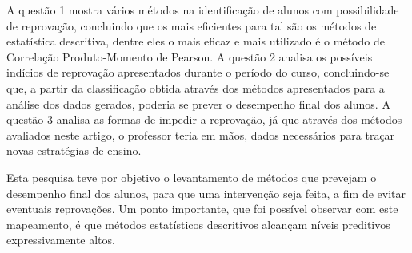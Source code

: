 \documentclass[12pt]{article}
\begin{document}
A questão 1 mostra vários métodos na identificação de alunos com possibilidade de reprovação, concluindo que os mais eficientes para tal são os métodos de estatística descritiva, dentre eles o mais eficaz e mais utilizado é o método de Correlação Produto-Momento de Pearson. A questão 2 analisa os possíveis indícios de reprovação apresentados durante o período do curso, concluindo-se que, a partir da classificação obtida através dos métodos apresentados para a análise dos dados gerados, poderia se prever o desempenho final dos alunos. A questão 3 analisa as formas de impedir a reprovação, já que através dos métodos avaliados neste artigo, o professor teria em mãos, dados necessários para traçar novas estratégias de ensino.

Esta pesquisa teve por objetivo o levantamento de métodos que prevejam o desempenho final dos alunos, para que uma intervenção seja feita, a fim de evitar eventuais reprovações. Um ponto importante, que foi possível observar com este mapeamento, é que métodos estatísticos descritivos alcançam níveis preditivos expressivamente altos. 



\end{document}
